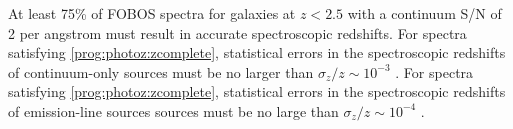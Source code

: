 \documentclass[11pt,a4paper,twoside,onecolumn,openany,final,oldfontcommands]{memoir}
\begin{document}
\medskip
\begin{sciencerequirement}
\reqitem At least 75\% of FOBOS spectra for galaxies at $z<2.5$ with a continuum S/N of 2 per angstrom must result in accurate spectroscopic redshifts. \label{prog:photoz:zcomplete}
\reqitem For spectra satisfying \ref{prog:photoz:zcomplete}, statistical errors in the spectroscopic redshifts of continuum-only sources must be no larger than $\sigma_z/z \sim 10^{-3}$ .
\reqitem For spectra satisfying \ref{prog:photoz:zcomplete}, statistical errors in the spectroscopic redshifts of emission-line sources sources must be no large than $\sigma_z/z \sim 10^{-4}$ .
\end{sciencerequirement}



\end{document}
